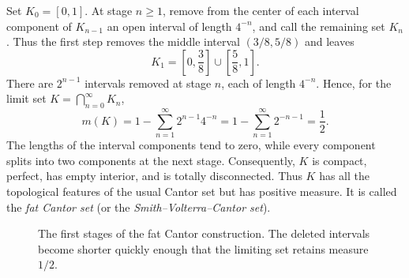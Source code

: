 \begin{example}\label{ex:fat-cantor-sep-15}
  Set $K_0=[0,1]$. At stage $n\geq1$, remove from the center of each
  interval component of $K_{n-1}$ an open interval of length $4^{-n}$,
  and call the remaining set $K_n$. Thus the first step removes the
  middle interval $(3/8,5/8)$ and leaves
  \[
    K_1=\left[0,\frac38\right]\cup
        \left[\frac58,1\right].
  \]
  There are $2^{n-1}$ intervals removed at stage $n$, each of length
  $4^{-n}$. Hence, for the limit set $K=\bigcap_{n=0}^{\infty}K_n$,
  \[
    m(K)
    =1-\sum_{n=1}^{\infty}2^{n-1}4^{-n}
    =1-\sum_{n=1}^{\infty}2^{-n-1}
    =\frac12.
  \]
  The lengths of the interval components tend to zero, while every
  component splits into two components at the next stage. Consequently,
  $K$ is compact, perfect, has empty interior, and is totally
  disconnected. Thus $K$ has all the topological features of the usual
  Cantor set but has positive measure. It is called the
  \emph{fat Cantor set} (or the \emph{Smith--Volterra--Cantor set}).

  \begin{figure}[htbp]
    \centering
    \caption{The first stages of the fat Cantor construction. The
      deleted intervals become shorter quickly enough that the limiting
      set retains measure $1/2$.}
    \label{fig:fat-cantor-sep-15}
  \end{figure}
\end{example}

